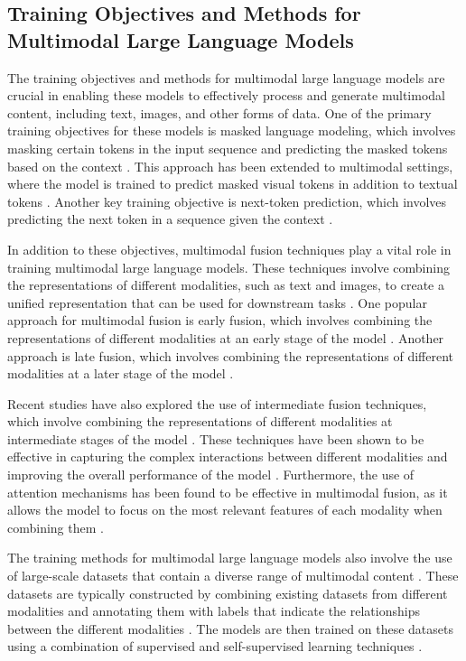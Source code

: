 \documentclass[11pt,a4paper]{article}
\begin{document}
\subsection{Training Objectives and Methods for Multimodal Large Language Models}


The training objectives and methods for multimodal large language models are crucial in enabling these models to effectively process and generate multimodal content, including text, images, and other forms of data. One of the primary training objectives for these models is masked language modeling, which involves masking certain tokens in the input sequence and predicting the masked tokens based on the context \cite{arxiv:1903.02930}. This approach has been extended to multimodal settings, where the model is trained to predict masked visual tokens in addition to textual tokens \cite{doi:10.1109/bigdata59044.2023.10386743}. Another key training objective is next-token prediction, which involves predicting the next token in a sequence given the context \cite{doi:10.18653/v1/2023.acl-long.411}.

In addition to these objectives, multimodal fusion techniques play a vital role in training multimodal large language models. These techniques involve combining the representations of different modalities, such as text and images, to create a unified representation that can be used for downstream tasks \cite{arxiv:2306.09093}. One popular approach for multimodal fusion is early fusion, which involves combining the representations of different modalities at an early stage of the model \cite{arxiv:2310.08825}. Another approach is late fusion, which involves combining the representations of different modalities at a later stage of the model \cite{arxiv:2305.16103}.

Recent studies have also explored the use of intermediate fusion techniques, which involve combining the representations of different modalities at intermediate stages of the model \cite{arxiv:2407.12709}. These techniques have been shown to be effective in capturing the complex interactions between different modalities and improving the overall performance of the model \cite{arxiv:2409.15310}. Furthermore, the use of attention mechanisms has been found to be effective in multimodal fusion, as it allows the model to focus on the most relevant features of each modality when combining them \cite{arxiv:2402.12750}.

The training methods for multimodal large language models also involve the use of large-scale datasets that contain a diverse range of multimodal content \cite{arxiv:2409.18142}. These datasets are typically constructed by combining existing datasets from different modalities and annotating them with labels that indicate the relationships between the different modalities \cite{arxiv:2408.15769}. The models are then trained on these datasets using a combination of supervised and self-supervised learning techniques \cite{arxiv:2401.13601}.
\end{document}
